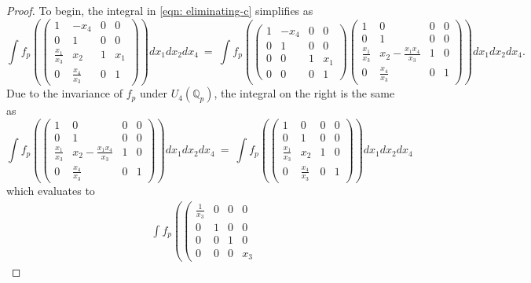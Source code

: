\documentclass[11pt]{amsart}
\begin{document}
\begin{proof}
To begin, the integral in \eqref{eqn: eliminating-c} simplifies as
$$
		\int f_p\left(\left(\begin{smallmatrix}
			1 & -x_4 & 0 & 0 \\
			0 & 1 & 0 & 0 \\
			\frac{x_1}{x_3} & x_2 & 1 & x_1 \\
			0 & \frac{x_4}{x_3} & 0 & 1
		\end{smallmatrix}\right) \right) dx_1 dx_2 dx_4 
\ = \ 
\int f_p\left( \left(\begin{smallmatrix}
			1 & -x_4 & 0 & 0 \\
			0 & 1 & 0 & 0 \\
			0 & 0 & 1 & x_1 \\
			0 & 0 & 0 & 1
		\end{smallmatrix}\right) 
		\left(\begin{smallmatrix}
			1 & 0 & 0 & 0 \\
			0 & 1 & 0 & 0 \\
			\frac{x_1}{x_3} & x_2 - \frac{x_1 x_4}{x_3} & 1 & 0 \\
			0 & \frac{x_4}{x_3} & 0 & 1
		\end{smallmatrix}\right)\right)dx_1 dx_2 dx_4. 
$$		
Due to the invariance of $f_p$ under $U_4(\mathbb{Q}_p)$, the integral on the right is the same as
$$
\int f_p \left(\left(\begin{smallmatrix}
			1 & 0 & 0 & 0 \\
			0 & 1 & 0 & 0 \\
			\frac{x_1}{x_3} & x_2 - \frac{x_1 x_4}{x_3} & 1 & 0 \\
			0 & \frac{x_4}{x_3} & 0 & 1
		\end{smallmatrix}\right) \right) dx_1 dx_2 dx_4 
\ = \ 
\int f_p\left( \left(\begin{smallmatrix}
			1 & 0 & 0 & 0 \\
			0 & 1 & 0 & 0 \\
			\frac{x_1}{x_3} & x_2  & 1 & 0 \\
			0 & \frac{x_4}{x_3} & 0 & 1
		\end{smallmatrix}\right) \right) dx_1 dx_2 dx_4 
$$
which evaluates to 
\begin{multline*}
\int f_p\left( \left(\begin{smallmatrix}
			\frac{1}{x_3} & 0 & 0 & 0 \\
			0 & 1 & 0 & 0 \\
			0 & 0 & 1 & 0 \\
			0 & 0 & 0 & x_3

\end{smallmatrix}
\end{multline*}
\end{proof}
\end{document}
